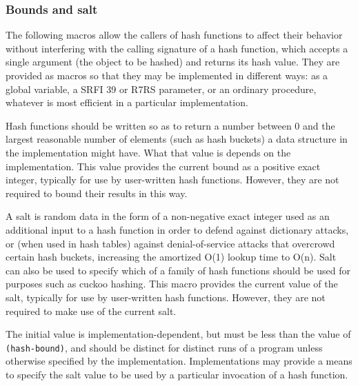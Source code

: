 \hypertarget{Boundsandsalt}{\subsubsection{Bounds and
salt}}

The following macros allow the callers of hash functions to affect their
behavior without interfering with the calling signature of a hash
function, which accepts a single argument (the object to be hashed) and
returns its hash value. They are provided as macros so that they may be
implemented in different ways: as a global variable, a SRFI 39 or R7RS
parameter, or an ordinary procedure, whatever is most efficient in a
particular implementation.

\begin{entry}{%
  }

  Hash functions should be written so as to return a number between 0
  and the largest reasonable number of elements (such as hash buckets)
  a data structure in the implementation might have. What that value
  is depends on the implementation. This value provides the current
  bound as a positive exact integer, typically for use by user-written
  hash functions. However, they are not required to bound their
  results in this way.
\end{entry}

\begin{entry}{%
  }

  A salt is random data in the form of a non-negative exact integer
  used as an additional input to a hash function in order to defend
  against dictionary attacks, or (when used in hash tables) against
  denial-of-service attacks that overcrowd certain hash buckets,
  increasing the amortized O(1) lookup time to O(n). Salt can also be
  used to specify which of a family of hash functions should be used
  for purposes such as cuckoo hashing. This macro provides the current
  value of the salt, typically for use by user-written hash
  functions. However, they are not required to make use of the current
  salt.

  The initial value is implementation-dependent, but must be less than
  the value of \texttt{(hash-bound)}, and should be distinct for
  distinct runs of a program unless otherwise specified by the
  implementation.  Implementations may provide a means to specify the
  salt value to be used by a particular invocation of a hash function.
\end{entry}


